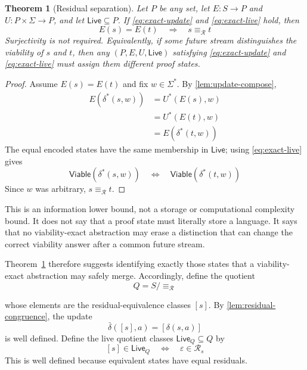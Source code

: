 \documentclass[11pt]{article}
\newtheorem{theorem}{Theorem}[section]
\theoremstyle{definition}
\newcommand{\States}{S}
\newcommand{\Additions}{\Sigma}
\newcommand{\Run}{\delta^{*}}
\newcommand{\Viable}{\mathsf{Viable}}
\newcommand{\Residual}{\mathcal R}
\newcommand{\ProofStates}{P}
\newcommand{\Live}{\mathsf{Live}}
\newcommand{\Encode}{E}
\newcommand{\Update}{U}
\newcommand{\ResidualEq}{\equiv_{\Residual}}
\newcommand{\eps}{\varepsilon}
\begin{document}
\begin{theorem}[Residual separation]\label{thm:separation}
Let $\ProofStates$ be any set, let $\Encode:\States\to\ProofStates$ and $\Update:\ProofStates\times\Additions\to\ProofStates$, and let $\Live\subseteq\ProofStates$. If \eqref{eq:exact-update} and \eqref{eq:exact-live} hold, then
\begin{equation}\label{eq:separation}
  \boxed{
  \Encode(s)=\Encode(t)
  \quad\Longrightarrow\quad
  s\ResidualEq t}
\end{equation}
Surjectivity is not required. Equivalently, if some future stream distinguishes the viability of $s$ and $t$, then any $(\ProofStates,\Encode,\Update,\Live)$ satisfying \eqref{eq:exact-update} and \eqref{eq:exact-live} must assign them different proof states.
\end{theorem}

\begin{proof}
Assume $\Encode(s)=\Encode(t)$ and fix $w\in\Additions^*$. By
\cref{lem:update-compose},
\[
\begin{aligned}
  \Encode(\Run(s,w))
    &=\Update^*(\Encode(s),w)\\
    &=\Update^*(\Encode(t),w)\\
    &=\Encode(\Run(t,w))
\end{aligned}
\]
The equal encoded states have the same membership in $\Live$; using \eqref{eq:exact-live} gives
\[
  \Viable(\Run(s,w))
  \quad\Longleftrightarrow\quad
  \Viable(\Run(t,w))
\]
Since $w$ was arbitrary, $s\ResidualEq t$.
\end{proof}

This is an information lower bound, not a storage or computational complexity bound.
It does not say that a proof state must literally store a language. It says
that no viability-exact abstraction may erase a distinction that can change
the correct viability answer after a common future stream.

Theorem~\ref{thm:separation} therefore suggests identifying exactly
those states that a viability-exact abstraction may safely merge. Accordingly,
define the quotient
\[
  Q = \States/{\ResidualEq}
\]

whose elements are the residual-equivalence classes $[s]$. 
By \cref{lem:residual-congruence}, the update
\begin{equation}\label{eq:quotient-update}
  \bar\delta([s],a)=[\delta(s,a)]
\end{equation}
is well defined. Define the live quotient classes $\Live_Q\subseteq Q$ by
\begin{equation}\label{eq:quotient-live}
  [s]\in\Live_Q
  \quad\Longleftrightarrow\quad
  \eps\in\Residual_s
\end{equation}
This is well defined because equivalent states have equal residuals.
\end{document}
